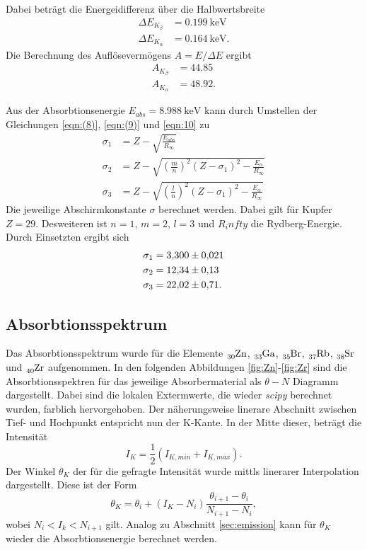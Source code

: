 Dabei beträgt die Energeidifferenz über die Halbwertsbreite
\begin{align*}
    \Delta E_{K_\beta}  &= \SI{0.199}{\kilo\electronvolt}\\
    \Delta E_{K_\alpha} &= \SI{0.164}{\kilo\electronvolt}   .
\end{align*}
Die Berechnung des Auflösevermögens $A=E/\Delta E$ ergibt
\begin{align*}
    A_{K_\beta}  &= \num{44.85}\\
    A_{K_\alpha} &= \num{48.92} . 
\end{align*}

Aus der Absorbtionsenergie $E_{abs}=\SI{8.988}{\kilo\electronvolt}$ \cite{AP04} kann durch Umstellen der Gleichungen \eqref{eqn:(8)},
\eqref{eqn:(9)} und \eqref{eqn:10} zu 
\begin{align*}
    \sigma_1&=Z-\sqrt{\frac{E_{abs}}{R_\infty}}\\
    \sigma_2&=Z-\sqrt{\left(\frac{m}{n}\right)^2(Z-\sigma_1)^2-\frac{E_\alpha}{R_\infty}}\\
    \sigma_3&=Z-\sqrt{\left(\frac{l}{n}\right)^2(Z-\sigma_1)^2-\frac{E_\alpha}{R_\infty}}
\end{align*}
Die jeweilige Abschirmkonstante $\sigma$ berechnet werden. Dabei gilt für Kupfer $Z=\num{29}$. Desweiteren ist $n=1$, $m=2$, $l=3$
und $R_infty$ die Rydberg-Energie. Durch Einsetzten ergibt sich
\begin{align*}
    \sigma_1&=\num{3.30  \pm 0.021}\\
    \sigma_2&=\num{12.34 \pm 0.13 }\\
    \sigma_3&=\num{22.02 \pm 0.71 }   .
\end{align*}

\subsection{Absorbtionsspektrum}
\label{sec:absorb}
Das Absorbtionsspektrum wurde für die Elemente $\ce{_{30}Zn}$, $\ce{_{33}Ga}$, $\ce{_{35}Br}$, $\ce{_{37}Rb}$, $\ce{_{38}Sr}$ und 
$\ce{_{40}Zr}$ aufgenommen. In den folgenden Abbildungen \ref{fig:Zn}-\ref{fig:Zr} sind die Absorbtionsspektren für das jeweilige
Absorbermaterial als $\theta-N$ Diagramm dargestellt. Dabei sind die lokalen Extermwerte, die wieder \textit{scipy} \cite{scipy}
berechnet wurden, farblich hervorgehoben. Der näherungsweise linerare Abschnitt zwischen Tief- und Hochpunkt entspricht nun der 
K-Kante. In der Mitte dieser, beträgt die Intensität
\begin{equation*}
    I_K=\frac{1}{2}(I_{K,min}+I_{K,max})   .
\end{equation*}
Der Winkel $\theta_K$ der für die gefragte Intensität wurde mittls linerarer Interpolation dargestellt. Diese ist der Form 
\begin{equation*}
    \theta_K=\theta_i+(I_K-N_i)\frac{\theta_{i+1}-\theta_i}{N_{i+1}-N_i},
\end{equation*}
wobei $N_i<I_k<N_{i+1}$ gilt. Analog zu Abschnitt \ref{sec:emission} kann für $\theta_K$ wieder die Absorbtionsenergie berechnet werden. 

